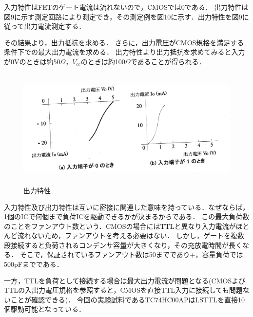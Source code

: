\documentclass[10pt, a4j, dvipdfmx]{jarticle}
\begin{document}
入力特性はFETのゲート電流は流れないので，CMOSでは0である．
出力特性は図9に示す測定回路により測定でき，その測定例を図10に示す．出力特性を図9に従って出力電流測定する．

その結果より，出力抵抗を求める．
さらに，出力電圧がCMOS規格を満足する条件下での最大出力電流を求める．
出力特性より出力抵抗を求めてみると入力が0Vのときは約50$\Omega$，$V_{cc}$のときは約100$\Omega$であることが得られる．
\begin{figure}[H]
  \centering
  \includegraphics[height=60mm, angle=-3]{実験テキスト/図10.png}
  \caption{出力特性}
\end{figure}

入力特性及び出力特性は互いに密接に関連した意味を持っている．なぜならば，1個のICで何個まで負荷ICを駆動できるかが決まるからである．
この最大負荷数のことをファンアウト数という．CMOSの場合にはTTLと異なり入力電流がほとんど流れないため，ファンアウトを考える必要はない．
しかし，ゲートを複数段接続すると負荷されるコンデンサ容量が大きくなり，その充放電時間が長くなる．
そこで，保証されているファンアウト数は50までであり+，容量負荷では500pFまでである．

一方，TTLを負荷として接続する場合は最大出力電流が問題となる(CMOSよびTTLの入出力電圧規格を参照すると，CMOSを直接TTL入力に接続しても問題ないことが確認できる)．
今回の実験試料であるTC74HC00APはLSTTLを直接10個駆動可能となっている．

\newpage
\end{document}
